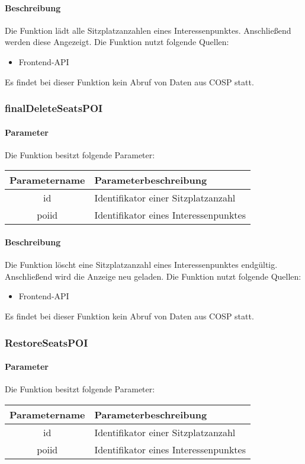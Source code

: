 \paragraph{Beschreibung} Die Funktion lädt alle Sitzplatzanzahlen eines Interessenpunktes. Anschließend werden diese Angezeigt. Die Funktion nutzt folgende Quellen:
\begin{itemize}
	\item Frontend-API
\end{itemize}
Es findet bei dieser Funktion kein Abruf von Daten aus {\glqq COSP\grqq} statt.
\subsubsection{finalDeleteSeatsPOI}
\paragraph{Parameter} Die Funktion besitzt folgende Parameter:
\begin{table}[H]
	\begin{tabular}{|c|p{11cm}|}
		\hline
		\textbf{Parametername} & \textbf{Parameterbeschreibung} \\ \hline
		id    & Identifikator einer Sitzplatzanzahl \\ \hline
		poiid & Identifikator eines Interessenpunktes \\ \hline
	\end{tabular}
\end{table}
\paragraph{Beschreibung} Die Funktion löscht eine Sitzplatzanzahl eines Interessenpunktes endgültig. Anschließend wird die Anzeige neu geladen. Die Funktion nutzt folgende Quellen:
\begin{itemize}
	\item Frontend-API
\end{itemize}
Es findet bei dieser Funktion kein Abruf von Daten aus {\glqq COSP\grqq} statt.
\subsubsection{RestoreSeatsPOI}
\paragraph{Parameter} Die Funktion besitzt folgende Parameter:
\begin{table}[H]
	\begin{tabular}{|c|p{11cm}|}
		\hline
		\textbf{Parametername} & \textbf{Parameterbeschreibung} \\ \hline
		id    & Identifikator einer Sitzplatzanzahl \\ \hline
		poiid & Identifikator eines Interessenpunktes \\ \hline
	\end{tabular}
\end{table}
